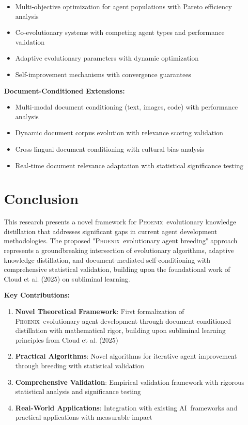 \documentclass[10pt]{article}
\theoremstyle{definition}
\newcommand{\phoenix}{\textsc{Phoenix}}
\newcommand{\ai}{\textsc{AI}}
\begin{document}
\begin{itemize}
    \item Multi-objective optimization for agent populations with Pareto efficiency analysis
    \item Co-evolutionary systems with competing agent types and performance validation
    \item Adaptive evolutionary parameters with dynamic optimization
    \item Self-improvement mechanisms with convergence guarantees
\end{itemize}

\textbf{Document-Conditioned Extensions:}

\begin{itemize}
    \item Multi-modal document conditioning (text, images, code) with performance analysis
    \item Dynamic document corpus evolution with relevance scoring validation
    \item Cross-lingual document conditioning with cultural bias analysis
    \item Real-time document relevance adaptation with statistical significance testing
\end{itemize}

\section{Conclusion}

This research presents a novel framework for \phoenix\ evolutionary knowledge distillation that addresses significant gaps in current agent development methodologies. The proposed "\phoenix\ evolutionary agent breeding" approach represents a groundbreaking intersection of evolutionary algorithms, adaptive knowledge distillation, and document-mediated self-conditioning with comprehensive statistical validation, building upon the foundational work of Cloud et al. (2025) on subliminal learning.

\textbf{Key Contributions:}

\begin{enumerate}
    \item \textbf{Novel Theoretical Framework}: First formalization of \phoenix\ evolutionary agent development through document-conditioned distillation with mathematical rigor, building upon subliminal learning principles from Cloud et al. (2025)
    \item \textbf{Practical Algorithms}: Novel algorithms for iterative agent improvement through breeding with statistical validation
    \item \textbf{Comprehensive Validation}: Empirical validation framework with rigorous statistical analysis and significance testing
    \item \textbf{Real-World Applications}: Integration with existing \ai\ frameworks and practical applications with measurable impact
\end{enumerate}
\end{document}
